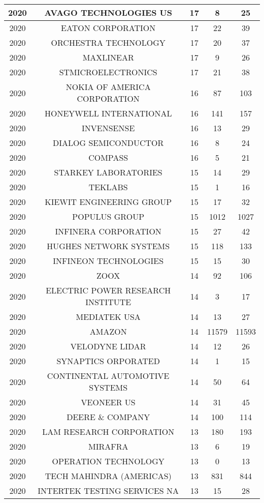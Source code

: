 \documentclass{article}%
\begin{document}
\begin{longtable}{c|c|c|c|c}
\hline%
2020&AVAGO TECHNOLOGIES US&17&8&25\\%
\hline%
2020&EATON CORPORATION&17&22&39\\%
\hline%
2020&ORCHESTRA TECHNOLOGY&17&20&37\\%
\hline%
2020&MAXLINEAR&17&9&26\\%
\hline%
2020&STMICROELECTRONICS&17&21&38\\%
\hline%
2020&NOKIA OF AMERICA CORPORATION&16&87&103\\%
\hline%
2020&HONEYWELL INTERNATIONAL&16&141&157\\%
\hline%
2020&INVENSENSE&16&13&29\\%
\hline%
2020&DIALOG SEMICONDUCTOR&16&8&24\\%
\hline%
2020&COMPASS&16&5&21\\%
\hline%
2020&STARKEY LABORATORIES&15&14&29\\%
\hline%
2020&TEKLABS&15&1&16\\%
\hline%
2020&KIEWIT ENGINEERING GROUP&15&17&32\\%
\hline%
2020&POPULUS GROUP&15&1012&1027\\%
\hline%
2020&INFINERA CORPORATION&15&27&42\\%
\hline%
2020&HUGHES NETWORK SYSTEMS&15&118&133\\%
\hline%
2020&INFINEON TECHNOLOGIES&15&15&30\\%
\hline%
2020&ZOOX&14&92&106\\%
\hline%
2020&ELECTRIC POWER RESEARCH INSTITUTE&14&3&17\\%
\hline%
2020&MEDIATEK USA&14&13&27\\%
\hline%
2020&AMAZON&14&11579&11593\\%
\hline%
2020&VELODYNE LIDAR&14&12&26\\%
\hline%
2020&SYNAPTICS ORPORATED&14&1&15\\%
\hline%
2020&CONTINENTAL AUTOMOTIVE SYSTEMS&14&50&64\\%
\hline%
2020&VEONEER US&14&31&45\\%
\hline%
2020&DEERE \& COMPANY&14&100&114\\%
\hline%
2020&LAM RESEARCH CORPORATION&13&180&193\\%
\hline%
2020&MIRAFRA&13&6&19\\%
\hline%
2020&OPERATION TECHNOLOGY&13&0&13\\%
\hline%
2020&TECH MAHINDRA (AMERICAS)&13&831&844\\%
\hline%
2020&INTERTEK TESTING SERVICES NA&13&15&28\\%

\end{longtable}
\end{document}
